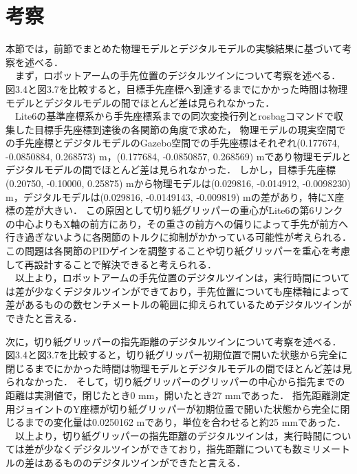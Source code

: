 \section{考察}
本節では，前節でまとめた物理モデルとデジタルモデルの実験結果に基づいて考察を述べる．\\
　まず，ロボットアームの手先位置のデジタルツインについて考察を述べる．
図3.4と図3.7を比較すると，目標手先座標へ到達するまでにかかった時間は物理モデルとデジタルモデルの間でほとんど差は見られなかった．\\
　Lite6の基準座標系から手先座標系までの同次変換行列とrosbagコマンドで収集した目標手先座標到達後の各関節の角度で求めた，
物理モデルの現実空間での手先座標とデジタルモデルのGazebo空間での手先座標はそれぞれ(0.177674, -0.0850884, 0.268573) m，(0.177684, -0.0850857, 0.268569) mであり物理モデルとデジタルモデルの間でほとんど差は見られなかった．
しかし，目標手先座標(0.20750, -0.10000, 0.25875) mから物理モデルは(0.029816, -0.014912, -0.0098230) m，デジタルモデルは(0.029816, -0.0149143, -0.009819) mの差があり，特にX座標の差が大きい．
この原因として切り紙グリッパーの重心がLite6の第6リンクの中心よりもX軸の前方にあり，その重さの前方への偏りによって手先が前方へ行き過ぎないように各関節のトルクに抑制がかかっている可能性が考えられる．
この問題は各関節のPIDゲインを調整することや切り紙グリッパーを重心を考慮して再設計することで解決できると考えられる．\\
　以上より，ロボットアームの手先位置のデジタルツインは，実行時間については差が少なくデジタルツインができており，手先位置についても座標軸によって差があるものの数センチメートルの範囲に抑えられているためデジタルツインができたと言える．

次に，切り紙グリッパーの指先距離のデジタルツインについて考察を述べる．
図3.4と図3.7を比較すると，切り紙グリッパー初期位置で開いた状態から完全に閉じるまでにかかった時間は物理モデルとデジタルモデルの間でほとんど差は見られなかった．
そして，切り紙グリッパーのグリッパーの中心から指先までの距離は実測値で，閉じたとき0 mm，開いたとき27 mmであった．
指先距離測定用ジョイントのY座標が切り紙グリッパーが初期位置で開いた状態から完全に閉じるまでの変化量は0.0250162 mであり，単位を合わせると約25 mmであった．\\
　以上より，切り紙グリッパーの指先距離のデジタルツインは，実行時間については差が少なくデジタルツインができており，指先距離についても数ミリメートルの差はあるもののデジタルツインができたと言える．